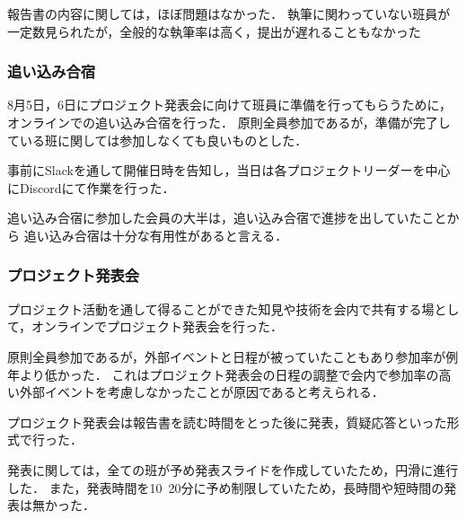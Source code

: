 報告書の内容に関しては，ほぼ問題はなかった．
執筆に関わっていない班員が一定数見られたが，全般的な執筆率は高く，提出が遅れることもなかった

\subsubsection*{追い込み合宿}
8月5日，6日にプロジェクト発表会に向けて班員に準備を行ってもらうために，オンラインでの追い込み合宿を行った．
原則全員参加であるが，準備が完了している班に関しては参加しなくても良いものとした．

事前にSlackを通して開催日時を告知し，当日は各プロジェクトリーダーを中心にDiscordにて作業を行った．

追い込み合宿に参加した会員の大半は，追い込み合宿で進捗を出していたことから
追い込み合宿は十分な有用性があると言える．

\subsubsection*{プロジェクト発表会}
プロジェクト活動を通して得ることができた知見や技術を会内で共有する場として，オンラインでプロジェクト発表会を行った．

原則全員参加であるが，外部イベントと日程が被っていたこともあり参加率が例年より低かった．
これはプロジェクト発表会の日程の調整で会内で参加率の高い外部イベントを考慮しなかったことが原因であると考えられる．

プロジェクト発表会は報告書を読む時間をとった後に発表，質疑応答といった形式で行った．

発表に関しては，全ての班が予め発表スライドを作成していたため，円滑に進行した．
また，発表時間を10~20分に予め制限していたため，長時間や短時間の発表は無かった．
